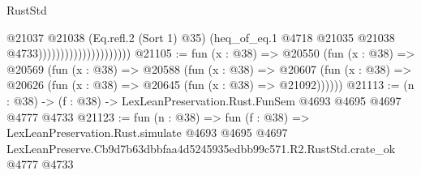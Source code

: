 \begin{lexlean}{RustStd}
\begin{coremodule}
                                          @21037
                                            @21038
                                            (Eq.refl.{2} (Sort 1) @35)
                                            (heq_of_eq.{1}
                                              @4718
                                              @21035
                                              @21038
                                              @4733)))))))))))))))))))))
@21105 := fun (x : @38) =>
  @20550
    (fun (x : @38) =>
    @20569
      (fun (x : @38) =>
      @20588
        (fun (x : @38) =>
        @20607 (fun (x : @38) => @20626 (fun (x : @38) => @20645 (fun (x : @38) => @21092))))))
@21113 := (n : @38) -> (f : @38) -> LexLeanPreservation.Rust.FunSem @4693 @4695 @4697 @4777 @4733
@21123 := fun (n : @38) =>
  fun (f : @38) =>
  LexLeanPreservation.Rust.simulate
    @4693
    @4695
    @4697
    LexLeanPreserve.Cb9d7b63dbbfaa4d5245935edbb99c571.R2.RustStd.crate_ok
    @4777
    @4733
\end{coremodule}
\end{lexlean}

